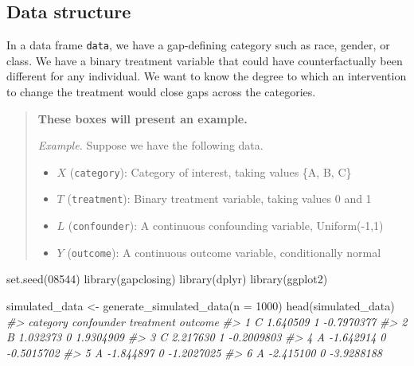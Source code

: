 \documentclass[
]{article}
\newenvironment{Shaded}{\begin{snugshade}}{\end{snugshade}}
\newcommand{\AttributeTok}[1]{\textcolor[rgb]{0.77,0.63,0.00}{#1}}
\newcommand{\CommentTok}[1]{\textcolor[rgb]{0.56,0.35,0.01}{\textit{#1}}}
\newcommand{\DecValTok}[1]{\textcolor[rgb]{0.00,0.00,0.81}{#1}}
\newcommand{\FunctionTok}[1]{\textcolor[rgb]{0.00,0.00,0.00}{#1}}
\newcommand{\NormalTok}[1]{#1}
\newcommand{\OtherTok}[1]{\textcolor[rgb]{0.56,0.35,0.01}{#1}}
\providecommand{\tightlist}{%
  \setlength{\itemsep}{0pt}\setlength{\parskip}{0pt}}
\begin{document}
\hypertarget{data-structure}{%
\subsection{Data structure}\label{data-structure}}

In a data frame \texttt{data}, we have a gap-defining category such as race, gender, or class. We have a binary treatment variable that could have counterfactually been different for any individual. We want to know the degree to which an intervention to change the treatment would close gaps across the categories.

\begin{quote}
\textbf{These boxes will present an example.}

\emph{Example.} Suppose we have the following data.

\begin{itemize}
\tightlist
\item
  \(X\) (\texttt{category}): Category of interest, taking values \{A, B, C\}
\item
  \(T\) (\texttt{treatment}): Binary treatment variable, taking values 0 and 1
\item
  \(L\) (\texttt{confounder}): A continuous confounding variable, Uniform(-1,1)
\item
  \(Y\) (\texttt{outcome}): A continuous outcome variable, conditionally normal
\end{itemize}
\end{quote}

\begin{Shaded}
\begin{Highlighting}[]
\FunctionTok{set.seed}\NormalTok{(}\DecValTok{08544}\NormalTok{)}
\FunctionTok{library}\NormalTok{(gapclosing)}
\FunctionTok{library}\NormalTok{(dplyr)}
\FunctionTok{library}\NormalTok{(ggplot2)}
\end{Highlighting}
\end{Shaded}

\begin{Shaded}
\begin{Highlighting}[]
\NormalTok{simulated\_data }\OtherTok{\textless{}{-}} \FunctionTok{generate\_simulated\_data}\NormalTok{(}\AttributeTok{n =} \DecValTok{1000}\NormalTok{)}
\FunctionTok{head}\NormalTok{(simulated\_data)}
\CommentTok{\#\textgreater{}   category confounder treatment    outcome}
\CommentTok{\#\textgreater{} 1        C   1.640509         1 {-}0.7970377}
\CommentTok{\#\textgreater{} 2        B   1.032373         0  1.9304909}
\CommentTok{\#\textgreater{} 3        C   2.217630         1 {-}0.2009803}
\CommentTok{\#\textgreater{} 4        A  {-}1.642914         0 {-}0.5015702}
\CommentTok{\#\textgreater{} 5        A  {-}1.844897         0 {-}1.2027025}
\CommentTok{\#\textgreater{} 6        A  {-}2.415100         0 {-}3.9288188}
\end{Highlighting}
\end{Shaded}
\end{document}
